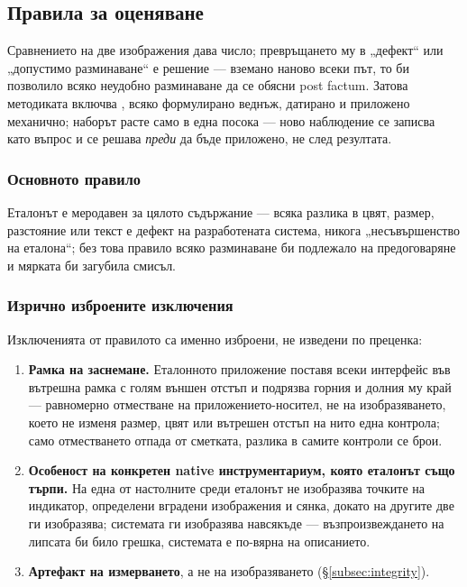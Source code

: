 \subsection{Правила за оценяване}
\label{subsec:rulings}

Сравнението на две изображения дава число; превръщането му в „дефект“ или „допустимо
разминаване“ е решение --- вземано наново всеки път, то би позволило всяко неудобно
разминаване да се обясни post factum. Затова методиката включва , всяко формулирано веднъж, датирано и приложено механично;
наборът расте само в една посока --- ново наблюдение се записва като въпрос и се решава
\emph{преди} да бъде приложено, не след резултата.

\subsubsection{Основното правило}

Еталонът е меродавен за цялото съдържание --- всяка разлика в цвят, размер, разстояние
или текст е дефект на разработената система, никога „несъвършенство на еталона“; без
това правило всяко разминаване би подлежало на предоговаряне и мярката би загубила
смисъл.

\subsubsection{Изрично изброените изключения}

Изключенията от правилото са именно изброени, не изведени по преценка:

\begin{enumerate}[topsep=2pt,itemsep=1pt,leftmargin=*]
\item \textbf{Рамка на заснемане.} Еталонното приложение поставя всеки интерфейс във
      вътрешна рамка с голям външен отстъп и подрязва горния и долния му край ---
      равномерно отместване на приложението-носител, не на изобразяването, което не
      изменя размер, цвят или вътрешен отстъп на нито една контрола; само отместването
      отпада от сметката, разлика в самите контроли се брои.
\item \textbf{Особеност на конкретен native инструментариум, която еталонът също
      търпи.} На една от настолните среди еталонът не изобразява точките на
      индикатор, определени вградени изображения и сянка, докато на другите две ги
      изобразява; системата ги изобразява навсякъде --- възпроизвеждането на липсата
      би било грешка, системата е по-вярна на описанието.
\item \textbf{Артефакт на измерването}, а не на изобразяването (§\ref{subsec:integrity}).
\end{enumerate}

